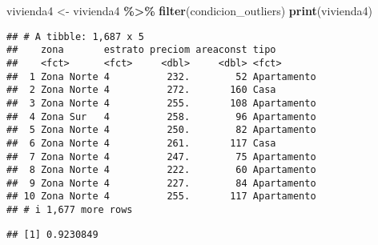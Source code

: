 \documentclass[
]{article}
\newenvironment{Shaded}{\begin{snugshade}}{\end{snugshade}}
\newcommand{\CommentTok}[1]{\textcolor[rgb]{0.56,0.35,0.01}{\textit{#1}}}
\newcommand{\DecValTok}[1]{\textcolor[rgb]{0.00,0.00,0.81}{#1}}
\newcommand{\FunctionTok}[1]{\textcolor[rgb]{0.13,0.29,0.53}{\textbf{#1}}}
\newcommand{\NormalTok}[1]{#1}
\newcommand{\OtherTok}[1]{\textcolor[rgb]{0.56,0.35,0.01}{#1}}
\newcommand{\SpecialCharTok}[1]{\textcolor[rgb]{0.81,0.36,0.00}{\textbf{#1}}}
\begin{document}
\begin{Shaded}
\end{Shaded}

\begin{Shaded}
\begin{Highlighting}[]
\NormalTok{vivienda4 }\OtherTok{\textless{}{-}}\NormalTok{ vivienda4 }\SpecialCharTok{\%\textgreater{}\%}
  \FunctionTok{filter}\NormalTok{(condicion\_outliers)}
\FunctionTok{print}\NormalTok{(vivienda4)}
\end{Highlighting}
\end{Shaded}

\begin{verbatim}
## # A tibble: 1,687 x 5
##    zona       estrato preciom areaconst tipo       
##    <fct>      <fct>     <dbl>     <dbl> <fct>      
##  1 Zona Norte 4          232.        52 Apartamento
##  2 Zona Norte 4          272.       160 Casa       
##  3 Zona Norte 4          255.       108 Apartamento
##  4 Zona Sur   4          258.        96 Apartamento
##  5 Zona Norte 4          250.        82 Apartamento
##  6 Zona Norte 4          261.       117 Casa       
##  7 Zona Norte 4          247.        75 Apartamento
##  8 Zona Norte 4          222.        60 Apartamento
##  9 Zona Norte 4          227.        84 Apartamento
## 10 Zona Norte 4          255.       117 Apartamento
## # i 1,677 more rows
\end{verbatim}

\begin{Shaded}
\end{Shaded}

\begin{verbatim}
## [1] 0.9230849
\end{verbatim}
\end{document}
